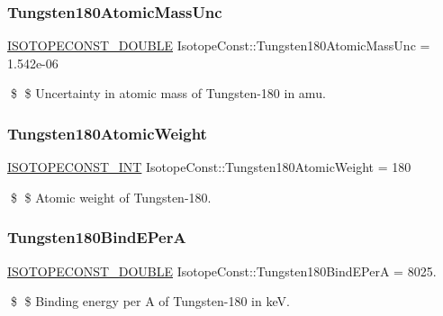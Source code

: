 \subsubsection{\texorpdfstring{Tungsten180\+Atomic\+Mass\+Unc}{Tungsten180AtomicMassUnc}}
{\footnotesize\ttfamily \mbox{\hyperlink{group___isotope_const-_macros_ga8f45a7272ce02c0b4c65c44636ed719a}{I\+S\+O\+T\+O\+P\+E\+C\+O\+N\+S\+T\+\_\+\+D\+O\+U\+B\+LE}} Isotope\+Const\+::\+Tungsten180\+Atomic\+Mass\+Unc = 1.\+542e-\/06}

\$ \$ Uncertainty in atomic mass of Tungsten-\/180 in amu. \mbox{\label{group___isotope_const-_tungsten-_w180_ga892d97f85df4be45d1b7ab0ab028d2d5}} 
\subsubsection{\texorpdfstring{Tungsten180\+Atomic\+Weight}{Tungsten180AtomicWeight}}
{\footnotesize\ttfamily \mbox{\hyperlink{group___isotope_const-_macros_ga5f18360b3e99483a35c32d789e62621c}{I\+S\+O\+T\+O\+P\+E\+C\+O\+N\+S\+T\+\_\+\+I\+NT}} Isotope\+Const\+::\+Tungsten180\+Atomic\+Weight = 180}

\$ \$ Atomic weight of Tungsten-\/180. \mbox{\label{group___isotope_const-_tungsten-_w180_ga82c99e323853b59b0308c2f335fe6347}} 
\subsubsection{\texorpdfstring{Tungsten180\+Bind\+E\+PerA}{Tungsten180BindEPerA}}
{\footnotesize\ttfamily \mbox{\hyperlink{group___isotope_const-_macros_ga8f45a7272ce02c0b4c65c44636ed719a}{I\+S\+O\+T\+O\+P\+E\+C\+O\+N\+S\+T\+\_\+\+D\+O\+U\+B\+LE}} Isotope\+Const\+::\+Tungsten180\+Bind\+E\+PerA = 8025.}

\$ \$ Binding energy per A of Tungsten-\/180 in keV. \mbox{\label{group___isotope_const-_tungsten-_w180_gadc57e5957df51d464f4262dc1b905ba4}} 
